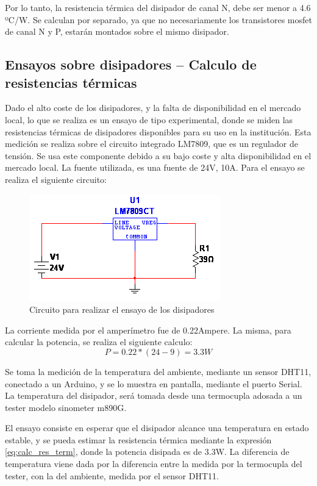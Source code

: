 Por lo tanto, la resistencia térmica del disipador de canal N, debe ser menor a 4.6 ºC/W. Se calculan por separado, ya que no necesariamente los transistores mosfet de canal N y P, estarán montados sobre el mismo disipador.  


\subsection{Ensayos sobre disipadores – Calculo de resistencias térmicas}

Dado el alto coste de los disipadores, y la falta de disponibilidad en el mercado local, lo que se realiza es un ensayo de tipo experimental, donde se miden las resistencias térmicas de  disipadores disponibles para su uso en la institución. Esta medición se realiza sobre el circuito integrado LM7809, que es un regulador de tensión. Se usa este componente debido a su bajo coste y alta disponibilidad en el mercado local. La fuente utilizada, es una fuente de 24V, 10A. Para el ensayo se realiza el siguiente circuito:

\begin{figure}[ht!]
	\centering
	\includegraphics{circuito_prueba_disip}
	\caption{Circuito para realizar el ensayo de los disipadores}
	\label{fig:circ_ensayo_disip}
\end{figure}

La corriente medida por el amperímetro fue de 0.22Ampere. La misma, para calcular la potencia, se realiza el siguiente calculo:
\[
P = 0.22*(24-9)=3.3W
\]

Se toma la medición de la temperatura del ambiente, mediante un sensor DHT11, conectado a un Arduino, y se lo muestra en pantalla, mediante el puerto Serial. La temperatura del disipador, será tomada desde una termocupla adosada a un tester modelo sinometer m890G.

El ensayo consiste en esperar que el disipador alcance una temperatura en estado estable, y se pueda estimar la resistencia térmica mediante la expresión \ref{eq:calc_res_term}, donde la potencia disipada es de 3.3W. La diferencia de temperatura viene dada por la diferencia entre la medida por la  termocupla del tester, con la del ambiente, medida por el sensor DHT11. 

